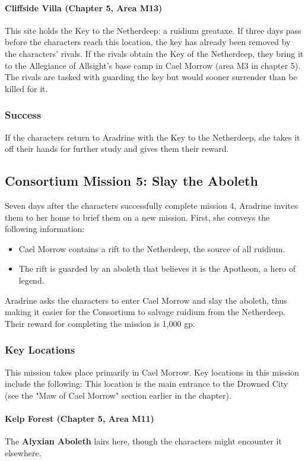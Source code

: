 \documentclass[10pt,a4,twoside,twocolumn,openany,nodeprecatedcode]{dndbook}
\begin{document}
\paragraph{Cliffside Villa (Chapter 5, Area M13)}
This site holds the Key to the Netherdeep: a ruidium greataxe. If three days pass before the characters reach this location, the key has already been removed by the characters' rivals.
If the rivals obtain the Key of the Netherdeep, they bring it to the Allegiance of Allsight's base camp in Cael Morrow (area M3 in chapter 5). The rivals are tasked with guarding the key but would sooner surrender than be killed for it.
\subsubsection{Success}
If the characters return to Aradrine with the Key to the Netherdeep, she takes it off their hands for further study and gives them their reward.
\subsection{Consortium Mission 5: Slay the Aboleth}
Seven days after the characters successfully complete mission 4, Aradrine invites them to her home to brief them on a new mission. First, she conveys the following information:
\begin{itemize}

\item Cael Morrow contains a rift to the Netherdeep, the source of all ruidium.
\item The rift is guarded by an aboleth that believes it is the Apotheon, a hero of legend.
\end{itemize}


Aradrine asks the characters to enter Cael Morrow and slay the aboleth, thus making it easier for the Consortium to salvage ruidium from the Netherdeep. Their reward for completing the mission is 1,000 gp.
\subsubsection{Key Locations}
This mission takes place primarily in Cael Morrow. Key locations in this mission include the following:
{{This location is the main entrance to the Drowned City (see the "Maw of Cael Morrow" section earlier in the chapter).}}
\paragraph{Kelp Forest (Chapter 5, Area M11)}
The \textbf{Alyxian Aboleth} lairs here, though the characters might encounter it elsewhere.
\end{document}
